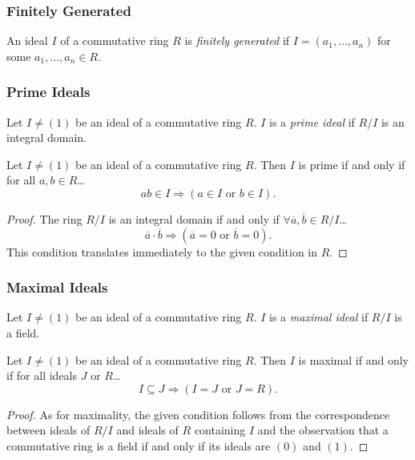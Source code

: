 \subsubsection{Finitely Generated}\label{finitelygenerated}
An ideal $I$ of a commutative ring $R$ is \emph{finitely generated} if $I = (a_1,\dots,a_n)$ for some $a_1, \dots, a_n \in R$.

\subsubsection{Prime Ideals}\label{primeideal}
Let $I \neq (1)$ be an ideal of a commutative ring $R$. $I$ is a \emph{prime ideal} if $R/I$ is an integral domain.

\begin{proposition}
\label{primeidealcharacterization}
Let $I \neq (1)$ be an ideal of a commutative ring $R$. Then $I$ is prime if and only if for all $a,b \in R$\dots
$$ab \in I \Rightarrow (a \in I \textrm{ or } b \in I).$$
\end{proposition}

\begin{proof}
The ring $R/I$ is an integral domain if and only if $\forall \overline{a}, \overline{b} \in R/I$\dots
$$\overline{a} \cdot \overline{b} \Rightarrow (\overline{a} = 0 \textrm{ or } \overline{b} = 0).$$
This condition translates immediately to the given condition in $R$.
\end{proof}

\subsubsection{Maximal Ideals}\label{maximalideal}
Let $I \neq (1)$ be an ideal of a commutative ring $R$. $I$ is a \emph{maximal ideal} if $R/I$ is a field.

\begin{proposition}
\label{maximalidealcharacterization}
Let $I \neq (1)$ be an ideal of a commutative ring $R$. Then $I$ is maximal if and only if for all ideals $J$ or $R$\dots
$$I \subseteq J \Rightarrow (I=J \textrm{ or } J=R).$$
\end{proposition}

\begin{proof}
As for maximality, the given condition follows from the correspondence between ideals of $R/I$ and ideals of $R$ containing $I$
and the observation that a commutative ring is a field if and only if its ideals are $(0)$ and $(1)$.
\end{proof}

